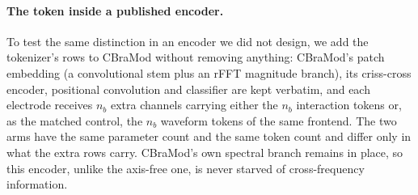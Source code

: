 \paragraph{The token inside a published encoder.}
To test the same distinction in an encoder we did not design, we add the
tokenizer's rows to CBraMod \citep{wang2025cbramod} without removing
anything: CBraMod's patch embedding (a convolutional stem plus an rFFT
magnitude branch), its criss-cross encoder, positional convolution and
classifier are kept verbatim, and each electrode receives $n_b$ extra
channels carrying either the $n_b$ interaction tokens or, as the matched
control, the $n_b$ waveform tokens of the same frontend. The two arms have
the same parameter count and the same token count and differ only in what
the extra rows carry. CBraMod's own spectral branch remains in place, so
this encoder, unlike the axis-free one, is never starved of
cross-frequency information.
